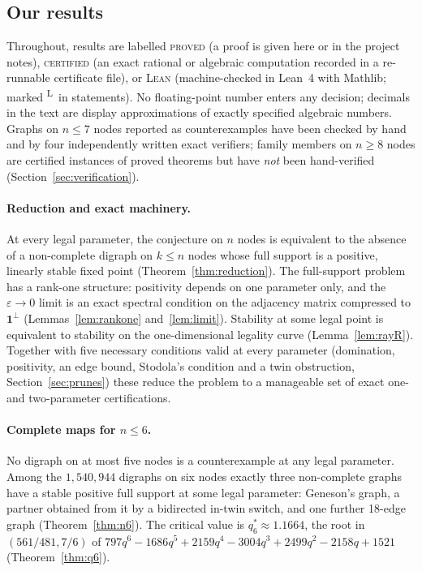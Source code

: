 \documentclass[11pt]{article}
\theoremstyle{definition}
\newcommand{\one}{\mathbf{1}}
\newcommand{\eps}{\varepsilon}
\newcommand{\lean}{\textsuperscript{\textsf{L}}}
\newcommand{\st}[1]{\textsc{#1}}
\begin{document}
\subsection{Our results}
Throughout, results are labelled \st{proved} (a proof is given here or in the project notes),
\st{certified} (an exact rational or algebraic computation recorded in a re-runnable certificate file),
or \st{Lean} (machine-checked in Lean~4 with Mathlib; marked \lean\ in statements). No floating-point
number enters any decision; decimals in the text are display approximations of exactly specified
algebraic numbers. Graphs on $n\le7$ nodes reported as counterexamples have been checked by hand and by
four independently written exact verifiers; family members on $n\ge8$ nodes are certified instances
of proved theorems but have \emph{not} been hand-verified (Section~\ref{sec:verification}).

\paragraph{Reduction and exact machinery.} At every legal parameter, the conjecture on $n$ nodes is
equivalent to the absence of a non-complete digraph on $k\le n$ nodes whose full support is a positive,
linearly stable fixed point (Theorem~\ref{thm:reduction}). The full-support problem has a rank-one
structure: positivity depends on one parameter only, and the $\eps\to0$ limit is an exact spectral
condition on the adjacency matrix compressed to $\one^\perp$ (Lemmas~\ref{lem:rankone}
and~\ref{lem:limit}). Stability at some legal point is equivalent to stability on the one-dimensional
legality curve (Lemma~\ref{lem:rayR}). Together with five necessary conditions valid at every parameter
(domination, positivity, an edge bound, Stodola's condition and a twin obstruction, Section~\ref{sec:prunes})
these reduce the problem to a manageable set of exact one- and two-parameter certifications.

\paragraph{Complete maps for $n\le6$.} No digraph on at most five nodes is a counterexample at any legal
parameter. Among the $1{,}540{,}944$ digraphs on six nodes exactly three non-complete graphs have a
stable positive full support at some legal parameter: Geneson's graph, a partner obtained from it by a
bidirected in-twin switch, and one further 18-edge graph (Theorem~\ref{thm:n6}). The critical value is
$q_6^*\approx1.1664$, the root in $(561/481,7/6)$ of
$797q^6-1686q^5+2159q^4-3004q^3+2499q^2-2158q+1521$ (Theorem~\ref{thm:q6}).
\end{document}
